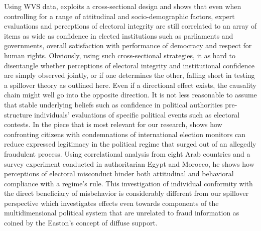 \documentclass[11pt, ngerman,english,a4]{article}
\begin{document}
Using WVS data, \citet{Norris2014, Norris2019} exploits a cross-sectional design and shows that even when controlling for a range of attitudinal and socio-demographic factors, expert evaluations and perceptions of electoral integrity are still correlated to an array of items as wide as confidence in elected institutions such as parliaments and governments, overall satisfaction with performance of democracy and respect for human rights. Obviously, using such cross-sectional strategies, it as hard to disentangle whether perceptions of electoral integrity and institutional confidence are simply observed jointly, or if one determines the other, falling short in testing a spillover theory as outlined here.  Even if a directional effect exists, the causality chain might well go into the opposite direction. It is not less reasonable to assume that stable underlying beliefs such as confidence in political authorities pre-structure individuals' evaluations of specific political events such as electoral contests. 
In the piece that is most relevant for our research, \citet{Williamson2021} shows how confronting citizens with condemnations of international election monitors can reduce expressed legitimacy in the political regime that surged out of an allegedly fraudulent process. Using correlational analysis from eight Arab countries and a survey experiment conducted in authoritarian Egypt and Morocco, he shows how perceptions of electoral misconduct hinder both attitudinal and behavioral compliance with a regime's rule. This investigation of individual conformity with the direct beneficiary of misbehavior is considerably different from our spillover perspective which investigates effects even towards components of the multidimensional political system that are unrelated to fraud information as coined by the Easton's concept of diffuse support. 

\end{document}
